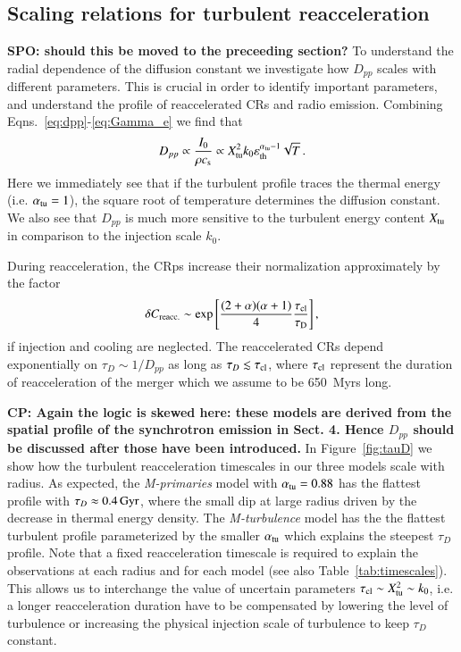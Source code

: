 \documentclass[fleqn,usenatbib,useAMS]{mnras}
\newcommand{\Mflatturb}{{\it M-turbulence}\xspace}
\newcommand{\Mprimary}{{\it M-primaries}\xspace}
\newcommand{\eps}{\varepsilon}
\def\SPO#1{{\bf {\color{red} SPO: #1}}}
\def\CP#1{{\bf {\color{mygreen} CP: #1}}}
\begin{document}
\subsection{Scaling relations for turbulent reacceleration}

\SPO{should this be moved to the preceeding section?}
To understand the radial dependence of the diffusion constant we
investigate how $D_{pp}$ scales with different parameters. This is
crucial in order to identify important parameters, and understand the
profile of reaccelerated CRs and radio emission. Combining
Eqns.~\ref{eq:dpp}-\ref{eq:Gamma_e} we find that 
\begin{equation}
  \label{eq:Dpp_scaling}
  D_{pp}\propto \frac{I_0}{\rho c_{\rmn{s}}} \propto 
X_\rmn{tu}^2k_0\eps_\rmn{th}^{\alpha_\rmn{tu}-1}\sqrt{T}\,.
\end{equation}
Here we immediately see that if the turbulent profile traces the
thermal energy (i.e. $\alpha_{\mathrm{tu}}=1$), the square root of
temperature determines the diffusion constant. We also see that
$D_{pp}$ is much more sensitive to the turbulent energy content
$X_{\mathrm{tu}}$ in comparison to the injection scale $k_0$.

During reacceleration, the CRps increase their normalization
approximately by the factor
\begin{equation}
  \label{eq:Creacc}
  \delta C_{\mathrm{reacc.}} \sim 
  \exp{\left[\frac{(2+\alpha)(\alpha+1)}{4}\frac{\tau_{\mathrm{cl}}}{\tau_{\mathrm{D}}}\right]}\,,
\end{equation}
if injection and cooling are neglected. The reaccelerated CRs depend
exponentially on $\tau_D\sim 1/D_{pp}$ as long as $\tau_D \lesssim
\tau_{\mathrm{cl}}$, where $\tau_{\mathrm{cl}}$ represent the duration of
reacceleration of the merger which we assume to be 650~Myrs long.

\CP{Again the logic is skewed here: these models are derived from the
  spatial profile of the synchrotron emission in Sect. 4. Hence
  $D_{pp}$ should be discussed after those have been introduced.}  In
Figure~\ref{fig:tauD} we show how the turbulent reacceleration
timescales in our three models scale with radius. As expected, the
\Mprimary model with $\alpha_{\mathrm{tu}}=0.88$ has the flattest profile
with $\tau_D\approx0.4\,{\mathrm{Gyr}}$, where the small dip at large
radius driven by the decrease in thermal energy density. The
\Mflatturb model has the the flattest turbulent profile parameterized
by the smaller $\alpha_{\mathrm{tu}}$ which explains the steepest $\tau_D$
profile. Note that a fixed reacceleration timescale is required to
explain the observations at each radius and for each model (see also
Table~\ref{tab:timescales}). This allows us to interchange the value
of uncertain parameters $\tau_{\mathrm{cl}} \sim X_{\mathrm{tu}}^2 \sim k_0$,
i.e. a longer reacceleration duration have to be compensated by
lowering the level of turbulence or increasing the physical injection
scale of turbulence to keep $\tau_D$ constant.
\end{document}

